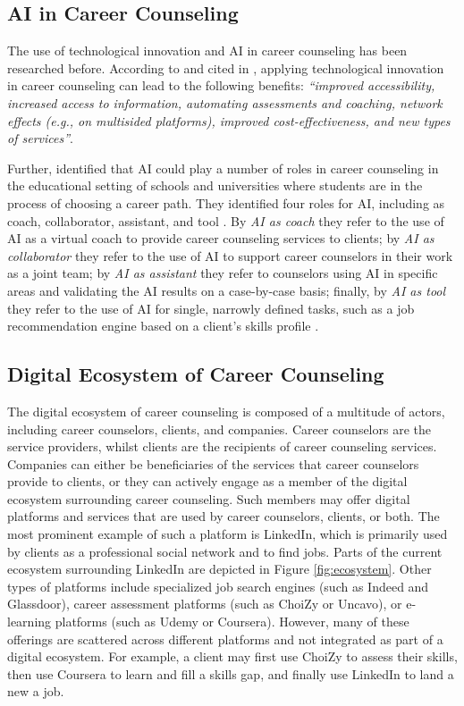\subsection{AI in Career Counseling}

The use of technological innovation and AI in career counseling has been researched before. According to
\cite{westmanArtificialIntelligenceCareer2021} and cited in \cite{kaserAIpoweredCareerCounseling2023}, applying
technological innovation in career counseling can lead to the following benefits: \textit{``improved accessibility,
increased access to information, automating assessments and coaching, network effects (e.g., on multisided platforms),
improved cost-effectiveness, and new types of services''}.

Further, \cite{westmanArtificialIntelligenceCareer2021} identified that AI could play a number of roles in career
counseling in the educational setting of schools and universities where students are in the process of choosing a career
path. They identified four roles for AI, including as coach, collaborator, assistant, and tool \citep{westmanArtificialIntelligenceCareer2021}.
By \textit{AI as coach} they refer to the use of AI as a virtual coach to provide career counseling services to clients; by
\textit{AI as collaborator} they refer to the use of AI to support career counselors in their work as a joint team; by
\textit{AI as assistant} they refer to counselors using AI in specific areas and validating the AI results on a case-by-case
basis; finally, by \textit{AI as tool} they refer to the use of AI for single, narrowly defined tasks, such as a job recommendation
engine based on a client's skills profile \citep{westmanArtificialIntelligenceCareer2021}.

\subsection{Digital Ecosystem of Career Counseling}

The digital ecosystem of career counseling is composed of a multitude of actors, including career counselors, clients,
and companies. Career counselors are the service providers, whilst clients are the recipients of career counseling services.
Companies can either be beneficiaries of the services that career counselors provide to clients, or they can actively engage
as a member of the digital ecosystem surrounding career counseling. Such members may offer digital platforms and services
that are used by career counselors, clients, or both. The most prominent example of such a platform is LinkedIn, which
is primarily used by clients as a professional social network and to find jobs. Parts of the current ecosystem surrounding
LinkedIn are depicted in Figure \ref{fig:ecosystem}. Other types of platforms include specialized job search engines (such as
Indeed and Glassdoor), career assessment platforms (such as ChoiZy or Uncavo), or e-learning platforms (such as Udemy or Coursera).
However, many of these offerings are scattered across different platforms and not integrated as part of a digital ecosystem. For
example, a client may first use ChoiZy to assess their skills, then use Coursera to learn and fill a skills gap, and finally use
LinkedIn to land a new a job.

